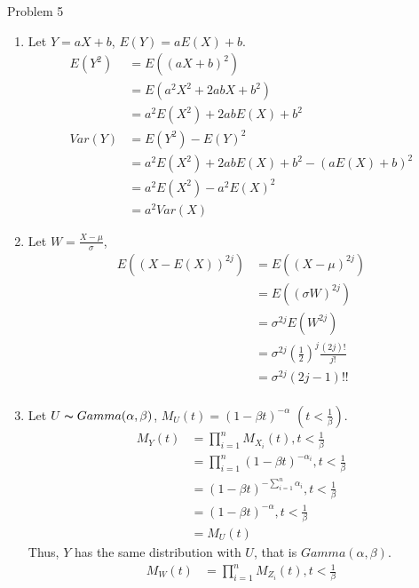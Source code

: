 \documentclass[12pt,letterpaper, onecolumn]{exam}
\begin{document}
\begin{questions}
    \question Problem 5
    \begin{solution}
        \begin{enumerate}
            \item Let $Y = aX+b$, $E(Y) = aE(X)+b$. 
            \begin{align*}
                E(Y^2) & = E((aX+b)^2) \\
                & = E(a^2X^2 + 2abX + b^2) \\
                & = a^2E(X^2)+2abE(X)+b^2 \\
                Var(Y) & = E(Y^2) - E(Y)^2 \\
                & = a^2E(X^2)+2abE(X)+b^2 - (aE(X) + b)^2 \\
                & = a^2E(X^2) - a^2E(X)^2 \\
                & = a^2Var(X)
            \end{align*}
            \item Let $W = \frac{X-\mu}{\sigma}$,
            \begin{align*}
                E((X-E(X))^{2j}) & = E((X-\mu)^{2j}) \\
                & = E((\sigma W)^{2j}) \\
                & = \sigma^{2j} E(W^{2j}) \\
                & = \sigma^{2j} (\frac{1}{2})^j\frac{(2j)!}{j!} \\
                & = \sigma^{2j} (2j-1)!! \\
            \end{align*}
            \item Let $U \thicksim Gamma(\alpha, \beta)$, $M_U(t) = (1-\beta t)^{-\alpha}$ $(t<\frac{1}{\beta})$. \\
            \begin{align*}
                M_Y(t) & = \prod_{i=1}^n M_{X_i}(t), t<\frac{1}{\beta} \\
                & = \prod_{i=1}^n (1-\beta t)^{-\alpha _i}, t<\frac{1}{\beta} \\
                & = (1-\beta t)^{-\sum_{i=1}^n \alpha _i}, t<\frac{1}{\beta} \\
                & = (1-\beta t)^{-\alpha}, t<\frac{1}{\beta} \\
                & = M_U(t)
            \end{align*}
            Thus, $Y$ has the same distribution with $U$, that is $Gamma(\alpha, \beta)$.
            \begin{align*}
                M_W(t) & = \prod_{i=1}^n M_{Z_i}(t), t<\frac{1}{\beta}\\

\end{align*}
\end{enumerate}
\end{solution}
\end{questions}
\end{document}
